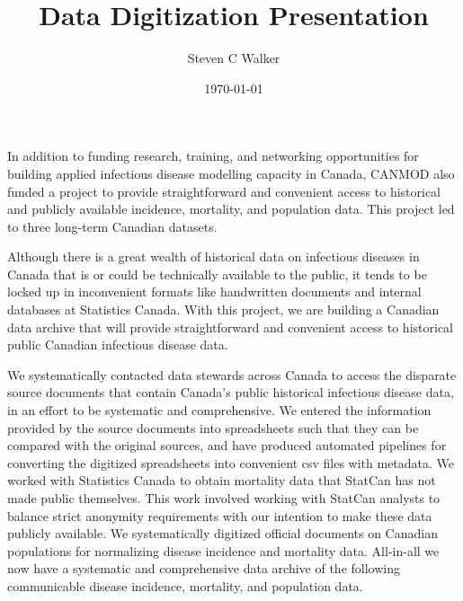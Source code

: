\documentclass{article}
\title{Data Digitization Presentation}
\date{\today}
\author{Steven C Walker}
\begin{document}
  \maketitle
  In addition to funding research, training, and networking opportunities for building applied infectious disease modelling capacity in Canada, CANMOD also funded a project to provide straightforward and convenient access to historical and publicly available incidence, mortality, and population data. This project led to three long-term Canadian datasets.

Although there is a great wealth of historical data on infectious diseases in Canada that is or could be technically available to the public, it tends to be locked up in inconvenient formats like handwritten documents and internal databases at Statistics Canada. With this project, we are building a Canadian data archive that will provide straightforward and convenient access to historical public Canadian infectious disease data.

We systematically contacted data stewards across Canada to access the disparate source documents that contain Canada's public historical infectious disease data, in an effort to be systematic and comprehensive. We entered the information provided by the source documents into spreadsheets such that they can be compared with the original sources, and have produced automated pipelines for converting the digitized spreadsheets into convenient csv files with metadata. We worked with Statistics Canada to obtain mortality data that StatCan has not made public themselves. This work involved working with StatCan analysts to balance strict anonymity requirements with our intention to make these data publicly available. We systematically digitized official documents on Canadian populations for normalizing disease incidence and mortality data. All-in-all we now have a systematic and comprehensive data archive of the following communicable disease incidence, mortality, and population data.
\end{document}
